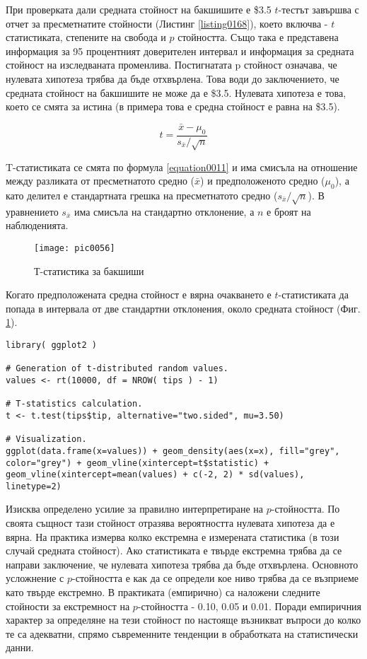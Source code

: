 При проверката дали средната стойност на бакшишите е \$3.5 $t$-тестът завършва с отчет за пресметнатите стойности (Листинг \ref{listing0168}), което включва - $t$ статистиката, степените на свобода и $p$ стойността. Също така е представена информация за 95 процентният доверителен интервал и информация за средната стойност на изследваната променлива. Постигнатата p стойност означава, че нулевата хипотеза трябва да бъде отхвърлена. Това води до заключението, че средната стойност на бакшишите не може да е \$3.5. Нулевата хипотеза е това, което се смята за истина (в примера това е средна стойност е равна на \$3.5). 

\begin{equation}
t = \frac{\bar{x}-\mu_0}{s_{\bar{x}}/\sqrt{n}}
\label{equation0011}
\end{equation}

T-статистиката се смята по формула \ref{equation0011} и има смисъла на отношение между разликата от пресметнатото средно ($\bar{x}$) и предположеното средно ($\mu_0$), а като делител е стандартната грешка на пресметнатото средно ($s_{\bar{x}}/\sqrt{n}$). В уравнението $s_{\bar{x}}$ има смисъла на стандартно отклонение, а $n$ е броят на наблюденията. 

\begin{figure}[h!]
  \centering
  \texttt{[image: pic0056]}
  \caption{Т-статистика за бакшиши}
\label{figure0056}
\end{figure}
\FloatBarrier

Когато предположената средна стойност е вярна очакването е $t$-статистиката да попада в интервала от две стандартни отклонения, около средната стойност (Фиг. \ref{figure0056}). 

\begin{lstlisting}[caption=Визуализация на t-разпределение, label=listing0169]
library( ggplot2 )

# Generation of t-distributed random values.
values <- rt(10000, df = NROW( tips ) - 1)

# T-statistics calculation.
t <- t.test(tips$tip, alternative="two.sided", mu=3.50)

# Visualization.
ggplot(data.frame(x=values)) + geom_density(aes(x=x), fill="grey", color="grey") + geom_vline(xintercept=t$statistic) + geom_vline(xintercept=mean(values) + c(-2, 2) * sd(values), linetype=2)
\end{lstlisting}

Изисква определено усилие за правилно интерпретиране на $p$-стойността. По своята същност тази стойност отразява вероятността нулевата хипотеза да е вярна. На практика измерва колко екстремна е измерената статистика (в този случай средната стойност). Ако статистиката е твърде екстремна трябва да се направи заключение, че нулевата хипотеза трябва да бъде отхвърлена. Основното усложнение с $p$-стойността е как да се определи кое ниво трябва да се възприеме като твърде екстремно. В практиката (емпирично) са наложени следните стойности за екстремност на $p$-стойността - 0.10, 0.05 и 0.01. Поради емпиричния характер за определяне на тези стойност по настояще възникват въпроси до колко те са адекватни, спрямо съвременните тенденции в обработката на статистически данни. 

